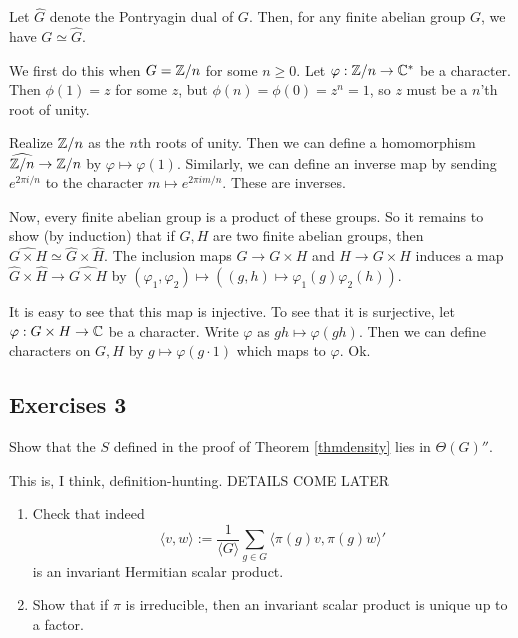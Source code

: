 \documentclass[11pt, english]{article}
\begin{document}
\begin{exc}
 Let $\hat G$ denote the Pontryagin dual of $G$. Then, for any finite abelian group $G$, we have $G \simeq \hat G$.
\end{exc}
\begin{sol}
We first do this when $G= \mathbb{Z}/n$ for some $n \geq 0$. Let $\varphi:\mathbb{Z}/n \to \mathbb{C}^\ast$ be a character. Then $\phi(1)=z$ for some $z$, but $\phi(n)=\phi(0)=z^n=1$, so $z$ must be a $n$'th root of unity.

Realize $\mathbb{Z}/n$ as the $n$th roots of unity. Then we can define a homomorphism $\widehat {\mathbb{Z}/n} \to \mathbb{Z}/n$ by $\varphi \mapsto \varphi(1)$. Similarly, we can define an inverse map by sending $e^{2\pi i/n}$  to the character $m \mapsto e^{2\pi i m /n}$. These are inverses.

Now, every finite abelian group is a product of these groups. So it remains to show (by induction) that if $G,H$ are two finite abelian groups, then $\widehat {G \times H} \simeq \widehat G \times \widehat H$. The inclusion maps $G \to G \times H$ and $H \to G \times H$ induces a map $\widehat G \times \widehat H \to \widehat{G \times H}$ by $(\varphi_1, \varphi_2) \mapsto ((g,h) \mapsto \varphi_1(g)\varphi_2(h))$.

It is easy to see that this map is injective. To see that it is surjective, let $\varphi:G \times H \to \mathbb{C}$ be a character. Write $\varphi$ as $gh \mapsto \varphi(gh)$. Then we can define characters on $G,H$ by $g \mapsto \varphi(g \cdot 1)$ which maps to $\varphi$. Ok.
\end{sol}

\subsection{Exercises 3}

\begin{exc}
Show that the $S$ defined in the proof of Theorem \eqref{thmdensity} lies in $\Theta(G)''$.
\end{exc}
\begin{sol}
 This is, I think, definition-hunting. DETAILS COME LATER
\end{sol}

\begin{exc}
  \begin{enumerate}
  \item Check that indeed 
$$
\langle v, w \rangle := \frac{1}{\langle G \rangle} \sum_{g \in G} \langle \pi(g) v, \pi(g) w \rangle'
$$
is an invariant Hermitian scalar product.
\item Show that if $\pi$ is irreducible, then an invariant scalar product is unique up to a factor.
  \end{enumerate}
\end{exc}
\end{document}
